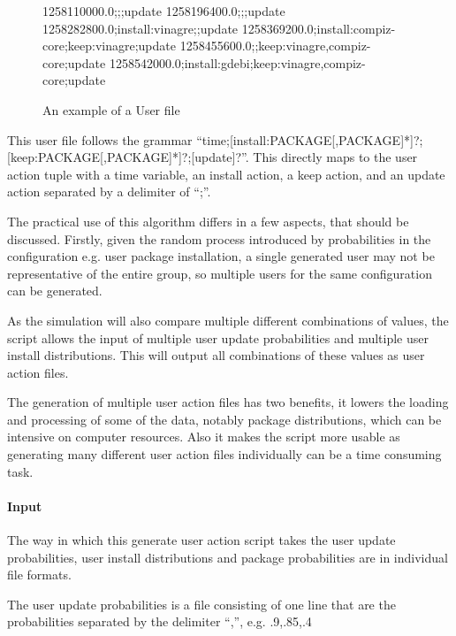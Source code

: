 \begin{figure}[htp]
\begin{center}
1258110000.0;;;update
1258196400.0;;;update
1258282800.0;install:vinagre;;update
1258369200.0;install:compiz-core;keep:vinagre;update
1258455600.0;;keep:vinagre,compiz-core;update
1258542000.0;install:gdebi;keep:vinagre,compiz-core;update
  \caption[User File example]{An example of a User file}
  \label{userfile}
\end{center}
\end{figure}

This user file follows the grammar ``time;[install:PACKAGE[,PACKAGE]*]?;[keep:PACKAGE[,PACKAGE]*]?;[update]?''.
This directly maps to the user action tuple with a time variable, an install action, a keep action, and an update action separated by a delimiter of ``;''.

The practical use of this algorithm differs in a few aspects, that should be discussed.
Firstly, given the random process introduced by probabilities in the configuration e.g. user package installation,
a single generated user may not be representative of the entire group, so multiple users for the same configuration can be generated.

As the simulation will also compare multiple different combinations of values, the script allows the input of multiple user update probabilities and multiple user install distributions.
This will output all combinations of these values as user action files.

The generation of multiple user action files has two benefits, it lowers the loading and processing of some of the data, notably package distributions, which can be intensive on computer resources.
Also it makes the script more usable as generating many different user action files individually can be a time consuming task.

\paragraph{Input}
The way in which this generate user action script takes the user update probabilities, user install distributions and package probabilities are in individual file formats.

The user update probabilities is a file consisting of one line that are the probabilities separated by the delimiter ``,'', e.g. .9,.85,.4


